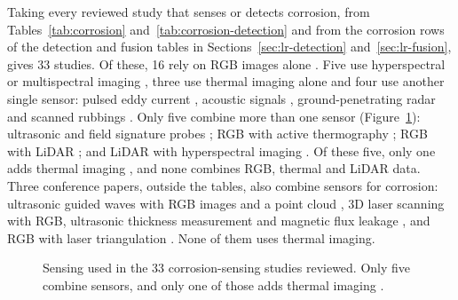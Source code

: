 Taking every reviewed study that senses or detects corrosion, from
Tables~\ref{tab:corrosion} and~\ref{tab:corrosion-detection} and from the
corrosion rows of the detection and fusion tables in
Sections~\ref{sec:lr-detection} and~\ref{sec:lr-fusion}, gives 33 studies. Of
these, 16 rely on RGB images alone
\citep{Malashin2024,Mao2026,Espinoza2026,Fu2024,Alvani2026,Imran2025,Yao2019,Nash2022,Savino2025,Maharjan2025,Li2024b,Suzuki2026,Rahman2021,Hu2023,Yu2023,HerndonTien2025}.
Five use hyperspectral or multispectral imaging \citep{Egodawela2025,DeKerf2022,Arias2025,Lavadiya2022,Hernndez-Surez2026}, three use
thermal imaging alone \citep{Elizalde2023,Doshvarpassand2022,Liu2021} and four use another single sensor: pulsed
eddy current \citep{Yang2025}, acoustic signals \citep{Yang2026a}, ground-penetrating radar \citep{Bui2026} and
scanned rubbings \citep{Khodabux2021a}. Only five combine more than one sensor (Figure~\ref{fig:corr-sensing}):
ultrasonic and field signature probes \citep{Huang2026a}; RGB with active thermography
\citep{Lim2021}; RGB with LiDAR \citep{Maru2025,PimenteldeFigueiredo2025}; and LiDAR with hyperspectral imaging
\citep{PallasEnguita2025}. Of these five, only one adds thermal imaging \citep{Lim2021}, and none combines
RGB, thermal and LiDAR data. Three conference papers, outside the tables, also
combine sensors for corrosion: ultrasonic guided waves with RGB images and a
point cloud \citep{Ding2025}, 3D laser scanning with RGB, ultrasonic thickness measurement
and magnetic flux leakage \citep{Zheng2025}, and RGB with laser triangulation \citep{Haitz2022}.
None of them uses thermal imaging.


\begin{figure}[htbp]
\centering
{}
\caption[Sensing used in the reviewed corrosion studies]{Sensing used in the 33 corrosion-sensing studies reviewed. Only five
combine sensors, and only one of those adds thermal imaging \citep{Lim2021}.}
\label{fig:corr-sensing}
\end{figure}

